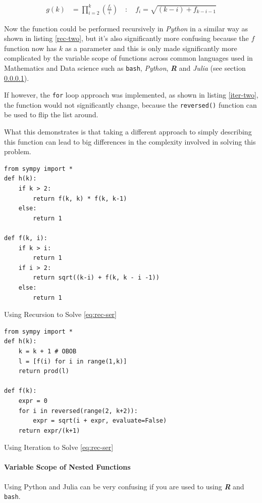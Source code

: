 \documentclass[11pt]{article}
\begin{document}
\begin{align}
    g\left( k \right) &=  \prod^k_{i = 2} \left( \frac{f_i}{i}  \right) \quad : \quad f_{i} = \sqrt{\left( k- i \right)  +  f_{k - i - 1}} \label{eq:clumsy}
\end{align}

Now the function could be performed recursively in \emph{Python} in a similar
way as shown in listing \ref{rec-two}, but it's also significantly more confusing because the \(f\) function now has \(k\) as a parameter and this is only made significantly more complicated by the variable scope of functions across common languages used in Mathematics and Data science such as \texttt{bash}, \emph{Python}, \textbf{\emph{R}} and \emph{Julia} (see section \ref{variable-scope-nested}).


If however, the \texttt{for} loop approach was implemented, as shown in listing
\ref{iter-two}, the function would not significantly change, because the \texttt{reversed()} function can be
used to flip the list around.

What this demonstrates is that taking a different approach to simply describing
this function can lead to big differences in the complexity involved in solving
this problem.

\begin{listing}[htbp]
\begin{verbatim}
from sympy import *
def h(k):
    if k > 2:
        return f(k, k) * f(k, k-1)
    else:
        return 1

def f(k, i):
    if k > i:
        return 1
    if i > 2:
        return sqrt((k-i) + f(k, k - i -1))
    else:
        return 1
\end{verbatim}
\caption{\label{rec-two}Using Recursion to Solve \eqref{eq:rec-ser}}
\end{listing}


\begin{listing}[htbp]
\begin{verbatim}
from sympy import *
def h(k):
    k = k + 1 # OBOB
    l = [f(i) for i in range(1,k)]
    return prod(l)

def f(k):
    expr = 0
    for i in reversed(range(2, k+2)):
        expr = sqrt(i + expr, evaluate=False)
    return expr/(k+1)
\end{verbatim}
\caption{\label{iter-two}Using Iteration to Solve \eqref{eq:rec-ser}}
\end{listing}

\paragraph{Variable Scope of Nested Functions}
\label{variable-scope-nested}
Using Python and Julia can be very confusing if you are used to using
\textbf{\emph{R}} and \texttt{bash}.
\end{document}
